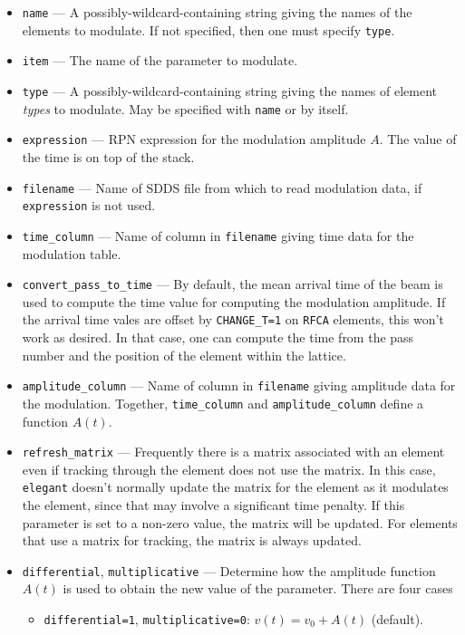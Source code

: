\documentclass[11pt]{article}
\begin{document}
\begin{itemize}
\item \verb|name| --- A possibly-wildcard-containing string giving the names of the
        elements to modulate. If not specified, then one must specify \verb|type|.
\item \verb|item| --- The name of the parameter to modulate.
\item \verb|type| --- A possibly-wildcard-containing string giving the names of element
        {\em types} to modulate.  May be specified with \verb|name| or by itself.
\item \verb|expression| --- RPN expression for the modulation amplitude $A$.  The value
  of the time is on top of the stack. 
\item \verb|filename| --- Name of SDDS file from which to read modulation data, if
  \verb|expression| is not used.
\item \verb|time_column| --- Name of column in \verb|filename| giving time data for the
  modulation table.
\item \verb|convert_pass_to_time| --- By default, the mean arrival time of the beam is used to
  compute the time value for computing the modulation amplitude.
  If the arrival time vales are offset by \verb|CHANGE_T=1| on \verb|RFCA| elements, this won't
  work as desired. In that case, one can compute the time from the pass number and the position
  of the element within the lattice.
\item \verb|amplitude_column| --- Name of column in \verb|filename| giving amplitude data
  for the modulation.  Together, \verb|time_column| and \verb|amplitude_column| define
  a function $A(t)$.
\item \verb|refresh_matrix| --- Frequently there is a matrix associated with an element even
  if tracking through the element does not use the matrix.  In this case, {\tt elegant} doesn't
  normally update the matrix for the element as it modulates the element, since that may involve
  a significant time penalty.  If this parameter is set to a non-zero value, the matrix will
  be updated.  For elements that use a matrix for tracking, the matrix is always updated.
\item \verb|differential|, \verb|multiplicative| --- Determine how the amplitude function
  $A(t)$ is used to obtain the new value of the parameter.  There are four cases
  \begin{itemize}
    \item \verb|differential=1|, \verb|multiplicative=0|: $v(t) = v_0 + A(t)$ (default).

\end{itemize}
\end{itemize}
\end{document}

